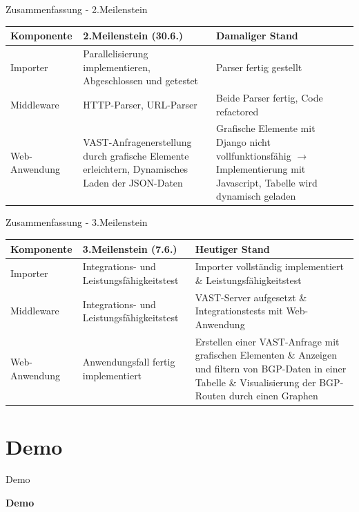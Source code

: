 \documentclass[9pt]{beamer}
\begin{document}
\begin{frame}{Zusammenfassung - 2.Meilenstein}
	\begin{table}[h!]
	\centering
	\begin{tabular}{p{5em} p{12em} p{14em}}
		\textbf{Komponente} & \textbf{2.Meilenstein (30.6.)} & \textbf{Damaliger Stand} \\ \midrule
		Importer & Parallelisierung implementieren, Abgeschlossen und getestet &  Parser fertig gestellt\\ \midrule
		Middleware & HTTP-Parser, URL-Parser	& Beide Parser fertig, Code refactored\\ \midrule
		Web-Anwendung &  VAST-Anfragenerstellung durch grafische Elemente erleichtern, Dynamisches Laden der JSON-Daten & Grafische Elemente mit Django nicht vollfunktionsfähig $\rightarrow$ Implementierung mit Javascript, Tabelle wird dynamisch geladen \\ \bottomrule
	\end{tabular}
	\end{table}
\end{frame}

\begin{frame}{Zusammenfassung - 3.Meilenstein}
	\begin{table}[h!]
	\centering
	\begin{tabular}{p{5em} p{12em} p{14em}}
		\textbf{Komponente} & \textbf{3.Meilenstein (7.6.)} & \textbf{Heutiger Stand} \\ \midrule
		Importer & Integrations- und Leistungsfähigkeitstest & Importer vollständig implementiert \& Leistungsfähigkeitstest \\ \midrule
		Middleware &  Integrations- und Leistungsfähigkeitstest & VAST-Server aufgesetzt \& Integrationstests mit Web-Anwendung \\ \midrule
		Web-Anwendung &  Anwendungsfall fertig implementiert & Erstellen einer VAST-Anfrage mit grafischen Elementen \& Anzeigen und filtern von BGP-Daten in einer Tabelle \& Visualisierung der BGP-Routen durch einen Graphen \\ \bottomrule
	\end{tabular}
	\end{table}
\end{frame}

\section{Demo}

\begin{frame}{Demo}
		\begin{center}
			\LARGE \textbf{Demo}
		\end{center}

\end{frame}
\end{document}
